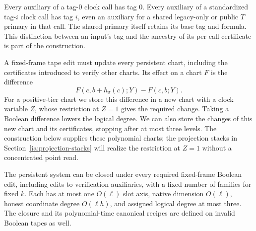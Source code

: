 Every auxiliary of a tag-$0$ clock call has tag $0$.  Every auxiliary
of a standardized tag-$i$ clock call has tag $i$, even an auxiliary
for a shared legacy-only or public $T$ primary in that call.  The
shared primary itself retains its base tag and formula.  This
distinction between an input's tag and the ancestry of its
per-call certificate is part of the construction.

A fixed-frame tape edit must update every persistent chart, including the
certificates introduced to verify other charts.  Its effect on a chart
$F$ is the difference
\[
 F(c,b+h_\sigma(c);Y)-F(c,b;Y).
\]
For a positive-tier chart we store this difference in a new chart with a
clock variable $Z$, whose restriction at $Z=1$ gives the required change.
Taking a Boolean difference lowers the logical degree.  We can also store the
changes of this new chart and its certificates, stopping after at most
three levels.  The construction below supplies these polynomial charts;
the projection stacks in Section~\ref{ia:projection-stacks} will realize
the restriction at $Z=1$ without a concentrated point read.

\begin{lemma}
\label{ia:derivative-closure}
The persistent system can be closed under every required fixed-frame
Boolean edit, including edits to verification auxiliaries, with a
fixed number of families for fixed $k$.  Each has at most one
$O(\ell)$ slot axis, native dimension $O(\ell)$, honest coordinate
degree $O(\ell h)$, and assigned logical degree at most three.  The
closure and its polynomial-time canonical recipes are defined on
invalid Boolean tapes as well.
\end{lemma}

